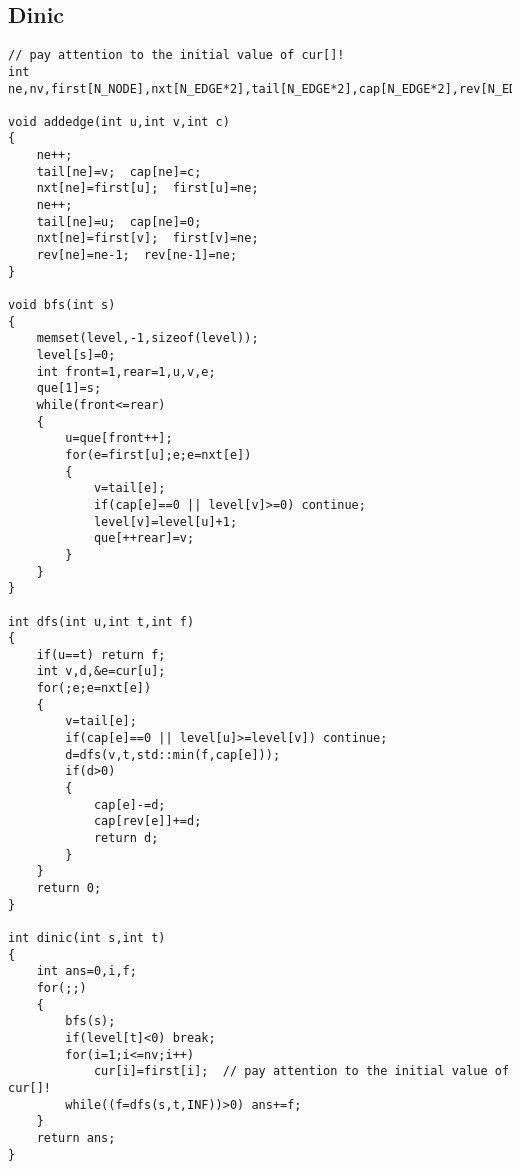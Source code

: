 \documentclass[a4paper,12pt]{article}
\begin{document}
\subsection{Dinic}
\begin{lstlisting}
// pay attention to the initial value of cur[]!
int ne,nv,first[N_NODE],nxt[N_EDGE*2],tail[N_EDGE*2],cap[N_EDGE*2],rev[N_EDGE*2],cur[N_NODE],level[N_NODE],que[N_NODE];

void addedge(int u,int v,int c)
{
    ne++;
    tail[ne]=v;  cap[ne]=c;
    nxt[ne]=first[u];  first[u]=ne;
    ne++;
    tail[ne]=u;  cap[ne]=0;
    nxt[ne]=first[v];  first[v]=ne;
    rev[ne]=ne-1;  rev[ne-1]=ne;
}

void bfs(int s)
{
    memset(level,-1,sizeof(level));
    level[s]=0;
    int front=1,rear=1,u,v,e;
    que[1]=s;
    while(front<=rear)
    {
        u=que[front++];
        for(e=first[u];e;e=nxt[e])
        {
            v=tail[e];
            if(cap[e]==0 || level[v]>=0) continue;
            level[v]=level[u]+1;
            que[++rear]=v;
        }
    }
}

int dfs(int u,int t,int f)
{
    if(u==t) return f;
    int v,d,&e=cur[u];
    for(;e;e=nxt[e])
    {
        v=tail[e];
        if(cap[e]==0 || level[u]>=level[v]) continue;
        d=dfs(v,t,std::min(f,cap[e]));
        if(d>0)
        {
            cap[e]-=d;
            cap[rev[e]]+=d;
            return d;
        }
    }
    return 0;
}

int dinic(int s,int t)
{
    int ans=0,i,f;
    for(;;)
    {
        bfs(s);
        if(level[t]<0) break;
        for(i=1;i<=nv;i++)
            cur[i]=first[i];  // pay attention to the initial value of cur[]!
        while((f=dfs(s,t,INF))>0) ans+=f;
    }
    return ans;
}
\end{lstlisting}
\end{document}
